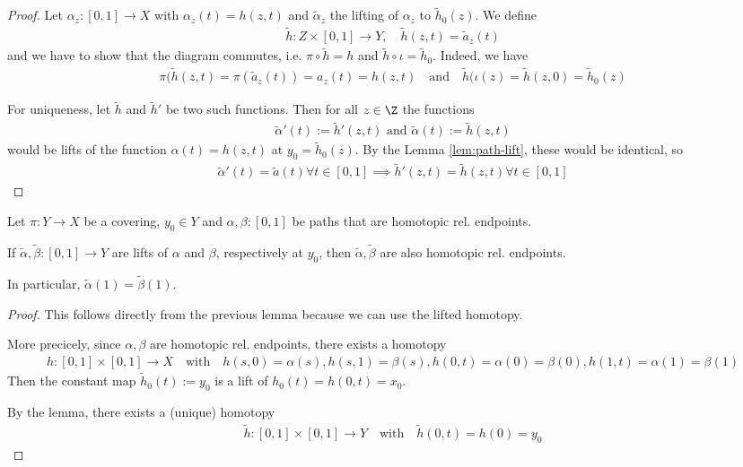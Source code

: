 \begin{proof}
  Let $\alpha_z: [0,1] \to X$ with $\alpha_z(t) = h(z,t)$ and $\tilde{\alpha}_z$ the lifting of $\alpha_z$ to $\tilde{h}_0(z)$.
  We define
  \begin{align*}
    \tilde{h}: Z \times [0,1] \to Y, \quad \tilde{h}(z,t) = \tilde{a}_z(t)
  \end{align*}
  and we have to show that the diagram commutes, i.e.
  $\pi \circ \tilde{h} = h$ and $\tilde{h} \circ \iota = \tilde{h}_0$.
  Indeed, we have
  \begin{align*}
    \pi(\tilde{h}(z,t) = \pi(\tilde{a}_z(t)) = a_z(t) = h(z,t) \quad \text{and} \quad \tilde{h}(\iota(z) = \tilde{h}(z,0) = \tilde{h}_0(z)
  \end{align*}
  
  For uniqueness, let $\tilde{h}$ and $\tilde{h}'$ be two such functions. Then for all $z \in \Z$ the functions
  \begin{align*}
    \tilde{\alpha}'(t) := \tilde{h}'(z,t) \text{ and } \tilde{\alpha}(t) := \tilde{h}(z,t)
  \end{align*}
  would be lifts of the function $\alpha(t) = h(z,t)$ at $y_0 = \tilde{h}_0(z)$.
  By the Lemma \ref{lem:path-lift}, these would be identical, so
  \begin{align*}
    \tilde{\alpha}'(t) = \tilde{a}(t) \forall t \in [0,1] \implies \tilde{h}'(z,t) = \tilde{h}(z,t) \forall t \in [0,1]
  \end{align*}
\end{proof}

\begin{cor}\label{cor:monodromy}
  Let $\pi: Y \to X$ be a covering, $y_0 \in Y$ and $\alpha,\beta:[0,1]$ be paths that are homotopic rel. endpoints.

  If $\tilde{\alpha},\tilde{\beta}:[0,1] \to Y$ are lifts of $\alpha$ and $\beta$, respectively at $y_0$, then $\tilde{\alpha}, \tilde{\beta}$ are also homotopic rel. endpoints.

  In particular, $\tilde{\alpha}(1) = \tilde{\beta}(1)$.
\end{cor}
\begin{proof}
This follows directly from the previous lemma because we can use the lifted homotopy.

More precicely, since $\alpha,\beta$ are homotopic rel. endpoints, there exists a homotopy
\begin{align*}
  h: [0,1] \times [0,1] \to X \quad \text{with} \quad h(s,0) = \alpha(s), h(s,1) = \beta(s), h(0,t) = \alpha(0) = \beta(0), h(1,t) = \alpha(1) = \beta(1)
\end{align*}
Then the constant map $\tilde{h}_0(t) := y_0$ is a lift of $h_0(t) = h(0,t) = x_0$.

By the lemma, there exists a (unique) homotopy
\begin{align*}
  \tilde{h}:[0,1] \times[0,1] \to Y \quad \text{with} \quad \tilde{h}(0,t) = h(0) = y_0
\end{align*}
\end{proof}





